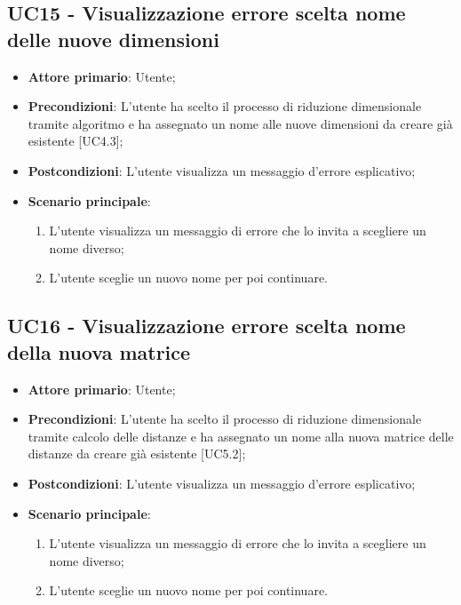 \subsection{UC15 - Visualizzazione errore scelta nome delle nuove dimensioni}
\begin{itemize}
	\item \textbf{Attore primario}: Utente;
	\item \textbf{Precondizioni}: L'utente ha scelto il processo di riduzione dimensionale tramite algoritmo e ha assegnato un nome alle nuove dimensioni da creare già esistente [UC4.3];
	\item \textbf{Postcondizioni}: L'utente visualizza un messaggio d'errore esplicativo;
	\item \textbf{Scenario principale}:
		\begin{enumerate}
			\item L'utente visualizza un messaggio di errore che lo invita a scegliere un nome diverso;
			\item L'utente sceglie un nuovo nome per poi continuare.
		\end{enumerate}
\end{itemize}

\subsection{UC16 - Visualizzazione errore scelta nome della nuova matrice}
\begin{itemize}
	\item \textbf{Attore primario}: Utente;
	\item \textbf{Precondizioni}: L'utente ha scelto il processo di riduzione dimensionale tramite calcolo delle distanze e ha assegnato un nome alla nuova matrice delle distanze da creare già esistente [UC5.2];
	\item \textbf{Postcondizioni}: L'utente visualizza un messaggio d'errore esplicativo;
	\item \textbf{Scenario principale}:
		\begin{enumerate}
			\item L'utente visualizza un messaggio di errore che lo invita a scegliere un nome diverso;
			\item L'utente sceglie un nuovo nome per poi continuare.
		\end{enumerate}
\end{itemize}

